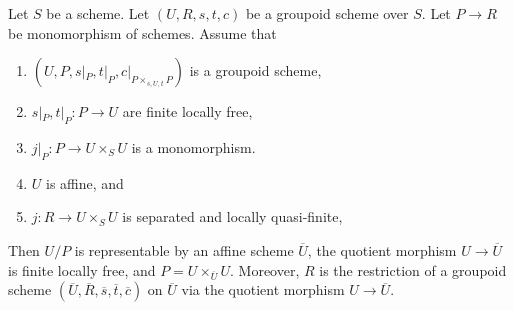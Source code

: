 \begin{lemma}
\label{lemma-divide-subgroupoid}
Let $S$ be a scheme.
Let $(U, R, s, t, c)$ be a groupoid scheme over $S$.
Let $P \to R$ be monomorphism of schemes. Assume that
\begin{enumerate}
\item $(U, P, s|_P, t|_P, c|_{P \times_{s, U, t}P})$ is a groupoid scheme,
\item $s|_P, t|_P : P \to U$ are finite locally free,
\item $j|_P : P \to U \times_S U$ is a monomorphism.
\item $U$ is affine, and
\item $j : R \to U \times_S U$ is separated and locally quasi-finite,
\end{enumerate}
Then $U/P$ is representable by an affine scheme $\overline{U}$, the
quotient morphism $U \to \overline{U}$ is finite locally free, and
$P = U \times_{\overline{U}} U$. Moreover, $R$ is the restriction of a
groupoid scheme
$(\overline{U}, \overline{R}, \overline{s}, \overline{t}, \overline{c})$
on $\overline{U}$ via the quotient morphism $U \to \overline{U}$.
\end{lemma}

